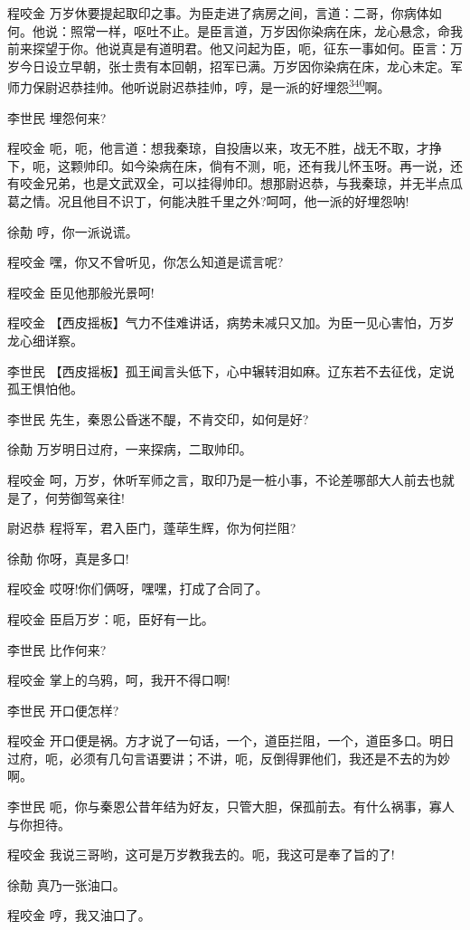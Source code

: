 程咬金
万岁休要提起取印之事。为臣走进了病房之间，言道：二哥，你病体如何。他说：照常一样，呕吐不止。是臣言道，万岁因你染病在床，龙心悬念，命我前来探望于你。他说真是有道明君。他又问起为臣，呃，征东一事如何。臣言：万岁今日设立早朝，张士贵有本回朝，招军已满。万岁因你染病在床，龙心未定。军师力保尉迟恭挂帅。他听说尉迟恭挂帅，哼，是一派的好埋怨\protect\hyperlink{fn340}{\textsuperscript{340}}啊。

李世民 埋怨何来?

程咬金
呃，呃，他言道：想我秦琼，自投唐以来，攻无不胜，战无不取，才挣下，呃，这颗帅印。如今染病在床，倘有不测，呃，还有我儿怀玉呀。再一说，还有咬金兄弟，也是文武双全，可以挂得帅印。想那尉迟恭，与我秦琼，并无半点瓜葛之情。况且他目不识丁，何能决胜千里之外?呵呵，他一派的好埋怨呐!

徐勣 哼，你一派说谎。

程咬金 嘿，你又不曾听见，你怎么知道是谎言呢?

程咬金 臣见他那般光景呵!

程咬金
【西皮摇板】气力不佳难讲话，病势未减只又加。为臣一见心害怕，万岁龙心细详察。

李世民
【西皮摇板】孤王闻言头低下，心中辗转泪如麻。辽东若不去征伐，定说孤王惧怕他。

李世民 先生，秦恩公昏迷不醍，不肯交印，如何是好?

徐勣 万岁明日过府，一来探病，二取帅印。

程咬金
呵，万岁，休听军师之言，取印乃是一桩小事，不论差哪部大人前去也就是了，何劳御驾亲往!

尉迟恭 程将军，君入臣门，蓬荜生辉，你为何拦阻?

徐勣 你呀，真是多口!

程咬金 哎呀!你们俩呀，嘿嘿，打成了合同了。

程咬金 臣启万岁：呃，臣好有一比。

李世民 比作何来?

程咬金 掌上的乌鸦，呵，我开不得口啊!

李世民 开口便怎样?

程咬金
开口便是祸。方才说了一句话，一个，道臣拦阻，一个，道臣多口。明日过府，呃，必须有几句言语要讲；不讲，呃，反倒得罪他们，我还是不去的为妙啊。

李世民
呃，你与秦恩公昔年结为好友，只管大胆，保孤前去。有什么祸事，寡人与你担待。

程咬金 我说三哥哟，这可是万岁教我去的。呃，我这可是奉了旨的了!

徐勣 真乃一张油口。

程咬金 哼，我又油口了。

